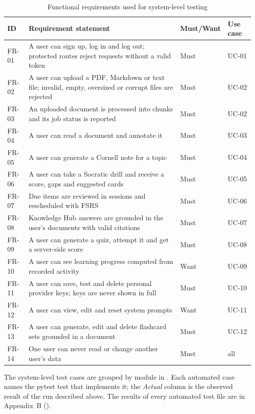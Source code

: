 \begin{table}[!htbp]
\centering
\caption{Functional requirements used for system-level testing}\label{tab:reqlist}
\small
\begin{tabularx}{\textwidth}{@{}l X l l@{}}
\toprule
\textbf{ID} & \textbf{Requirement statement} & \textbf{Must/Want} & \textbf{Use case}\\
\midrule
FR-01 & A user can sign up, log in and log out; protected routes reject requests without a valid token & Must & UC-01\\
FR-02 & A user can upload a PDF, Markdown or text file; invalid, empty, oversized or corrupt files are rejected & Must & UC-02\\
FR-03 & An uploaded document is processed into chunks and its job status is reported & Must & UC-02\\
FR-04 & A user can read a document and annotate it & Must & UC-03\\
FR-05 & A user can generate a Cornell note for a topic & Must & UC-04\\
FR-06 & A user can take a Socratic drill and receive a score, gaps and suggested cards & Must & UC-05\\
FR-07 & Due items are reviewed in sessions and rescheduled with FSRS & Must & UC-06\\
FR-08 & Knowledge Hub answers are grounded in the user's documents with valid citations & Must & UC-07\\
FR-09 & A user can generate a quiz, attempt it and get a server-side score & Must & UC-08\\
FR-10 & A user can see learning progress computed from recorded activity & Want & UC-09\\
FR-11 & A user can save, test and delete personal provider keys; keys are never shown in full & Must & UC-10\\
FR-12 & A user can view, edit and reset system prompts & Want & UC-11\\
FR-13 & A user can generate, edit and delete flashcard sets grounded in a document & Must & UC-12\\
FR-14 & One user can never read or change another user's data & Must & all\\
\bottomrule
\end{tabularx}
\end{table}

The system-level test cases are grouped by module in .
Each automated case names the pytest test that implements it; the \emph{Actual} column is the observed
result of the run described above. The results of every automated test file are in
Appendix~B ().

